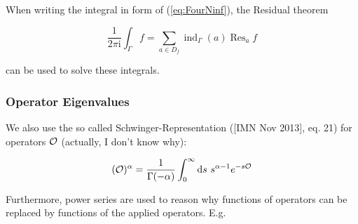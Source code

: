 \documentclass[10pt,a4paper, fleqn]{article}
\begin{document}
When writing the integral in form of (\ref{eq:FourNinf}), the Residual theorem

\begin{equation}
\frac{1}{2\pi\mathrm{i}}\int_\Gamma f=\sum_{a\in D_f}\operatorname{ind}_{\Gamma}(a)\operatorname{Res}_a f
\end{equation}

can be used to solve these integrals.
%
%
%
%
%
%
%

\subsubsection{Operator Eigenvalues}
We also use the so called Schwinger-Representation ([IMN Nov 2013], eq. 21) for operators ${\cal O}$ (actually, I don't know why):

\begin{equation}
({\cal O})^\alpha = \frac 1{\Gamma(-\alpha)} \int_0^\infty \mathrm{d} s~ s^{\alpha - 1} e^{-s {\cal O}}
\end{equation}

Furthermore, power series are used to reason why functions of operators can be replaced by functions of the applied operators. E.g.
\end{document}
